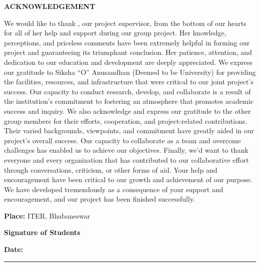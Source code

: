 \begin{center}{\Large\bfseries ACKNOWLEDGEMENT}\end{center}
\vspace{1em}

We would like to thank \supervisor, our project supervisor, from the bottom of our hearts for all of her help and support during our group project. Her knowledge, perceptions, and priceless comments have been extremely helpful in forming our project and guaranteeing its triumphant conclusion. Her patience, attention, and dedication to our education and development are deeply appreciated. We express our gratitude to Siksha ``O'' Anusandhan (Deemed to be University) for providing the facilities, resources, and infrastructure that were critical to our joint project's success. Our capacity to conduct research, develop, and collaborate is a result of the institution's commitment to fostering an atmosphere that promotes academic success and inquiry. We also acknowledge and express our gratitude to the other group members for their efforts, cooperation, and project-related contributions. Their varied backgrounds, viewpoints, and commitment have greatly aided in our project's overall success. Our capacity to collaborate as a team and overcome challenges has enabled us to achieve our objectives. Finally, we'd want to thank everyone and every organization that has contributed to our collaborative effort through conversations, criticism, or other forms of aid. Your help and encouragement have been critical to our growth and achievement of our purpose. We have developed tremendously as a consequence of your support and encouragement, and our project has been finished successfully.

\vspace{3em}
\noindent\begin{minipage}[t]{0.45\textwidth}
\textbf{Place:} ITER, Bhubaneswar
\end{minipage}
\hfill
\begin{minipage}[t]{0.45\textwidth}
\textbf{Signature of Students}\\[3em]
\rule{0pt}{0pt}
\end{minipage}

\vspace{0.5em}
\textbf{Date:} \rule{4cm}{0.4pt}
\newpage
